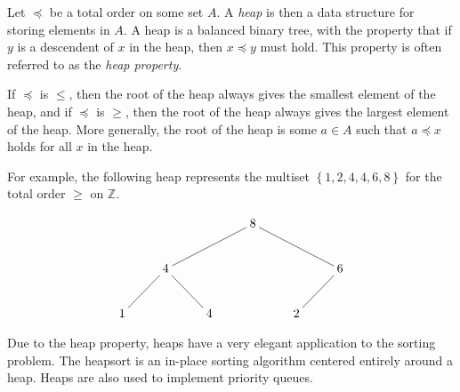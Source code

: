 \documentclass[12pt]{article}
\begin{document}
Let $\preceq$ be a total order on some set $A$.  A \emph{heap} is then a data structure for storing elements in $A$.  A heap is a balanced binary tree, with the property that if $y$ is a descendent of $x$ in the heap, then $x\preceq y$ must hold.  This property is often referred to as the \emph{heap property}.

If $\preceq$ is $\leq$, then the root of the heap always gives the smallest element of the heap, and if $\preceq$ is $\geq$, then the root of the heap always gives the largest element of the heap.  More generally, the root of the heap is some $a\in A$ such that $a\preceq x$ holds for all $x$ in the heap.

For example, the following heap represents the multiset $\left\{ 1, 2, 4, 4, 6, 8 \right\}$ for the total order $\geq$ on $\mathbb{Z}$.

$$
\xymatrix{
&&& 8 \ar@{-}[dll] \ar@{-}[drr] \\
& 4 \ar@{-}[dl] \ar@{-}[dr] &&&& 6 \ar@{-}[dl] \\
1 && 4 && 2
}
$$

Due to the heap property, heaps have a very elegant application to the sorting problem.  The heapsort is an in-place sorting algorithm centered entirely around a heap.  Heaps are also used to implement priority queues.
\end{document}

